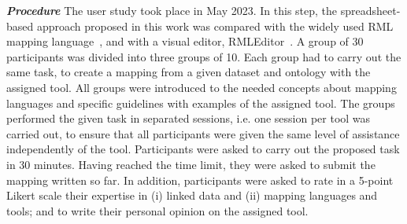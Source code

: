 

\noindent\textit{\textbf{Procedure}} 
The user study took place in May 2023. %
In this step, the spreadsheet-based approach proposed in this work was compared with the widely used RML mapping language~\cite{Dimou2014rml}, and with a visual editor, RMLEditor~\cite{heyvaert2016rmleditor}. A group of 30 participants was divided into three groups of 10. Each group had to carry out the same task, to create a mapping from a given dataset and ontology with the assigned tool. All groups were introduced to the needed concepts about mapping languages and specific guidelines with examples of the assigned tool. The groups performed the given task in separated sessions, i.e. one session per tool was carried out, to ensure that all participants were given the same level of assistance independently of the tool. Participants were asked to carry out the proposed task in 30 minutes. Having reached the time limit, they were asked to submit the mapping written so far. In addition, participants were asked to rate in a 5-point Likert scale their expertise in (i) linked data and (ii) mapping languages and tools; and to write their personal opinion on the assigned tool.


